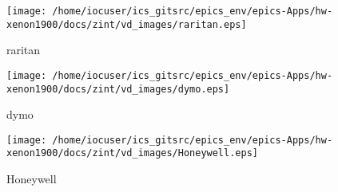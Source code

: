 \noindent
\vspace{1.4cm}
\begin{minipage}{.2\textwidth}
\begin{center}
\texttt{[image: /home/iocuser/ics\_gitsrc/epics\_env/epics-Apps/hw-xenon1900/docs/zint/vd\_images/raritan.eps]}
\end{center}
\end{minipage}
\begin{minipage}{.7\textwidth}
raritan
\end{minipage}


\noindent
\vspace{1.4cm}
\begin{minipage}{.2\textwidth}
\begin{center}
\texttt{[image: /home/iocuser/ics\_gitsrc/epics\_env/epics-Apps/hw-xenon1900/docs/zint/vd\_images/dymo.eps]}
\end{center}
\end{minipage}
\begin{minipage}{.7\textwidth}
dymo
\end{minipage}


\noindent
\vspace{1.4cm}
\begin{minipage}{.2\textwidth}
\begin{center}
\texttt{[image: /home/iocuser/ics\_gitsrc/epics\_env/epics-Apps/hw-xenon1900/docs/zint/vd\_images/Honeywell.eps]}
\end{center}
\end{minipage}
\begin{minipage}{.7\textwidth}
Honeywell
\end{minipage}


